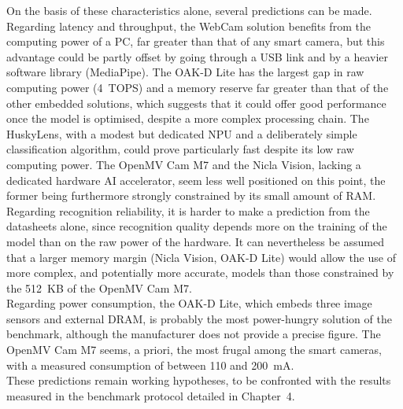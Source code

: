 \documentclass[12pt,a4paper]{report}
\begin{document}
	\newpage
	
	On the basis of these characteristics alone, several predictions can be made.\\
	
	Regarding latency and throughput, the WebCam solution benefits from the computing power of a PC, far greater than that of any smart camera, but this advantage could be partly offset by going through a USB link and by a heavier software library (MediaPipe).\newline
	The OAK-D Lite has the largest gap in raw computing power (4~TOPS) and a memory reserve far greater than that of the other embedded solutions, which suggests that it could offer good performance once the model is optimised, despite a more complex processing chain.\newline 
	The HuskyLens, with a modest but dedicated NPU and a deliberately simple classification algorithm, could prove particularly fast despite its low raw computing power.\newline
	The OpenMV Cam M7 and the Nicla Vision, lacking a dedicated hardware AI accelerator, seem less well positioned on this point, the former being furthermore strongly constrained by its small amount of RAM.\\
	
	Regarding recognition reliability, it is harder to make a prediction from the datasheets alone, since recognition quality depends more on the training of the model than on the raw power of the hardware. It can nevertheless be assumed that a larger memory margin (Nicla Vision, OAK-D Lite) would allow the use of more complex, and potentially more accurate, models than those constrained by the 512~KB of the OpenMV Cam M7.\\
	
	Regarding power consumption, the OAK-D Lite, which embeds three image sensors and external DRAM, is probably the most power-hungry solution of the benchmark, although the manufacturer does not provide a precise figure. The OpenMV Cam M7 seems, a priori, the most frugal among the smart cameras, with a measured consumption of between 110 and 200~mA.\\
	
	These predictions remain working hypotheses, to be confronted with the results measured in the benchmark protocol detailed in Chapter~4.
	
	\newpage
	
	
\end{document}
